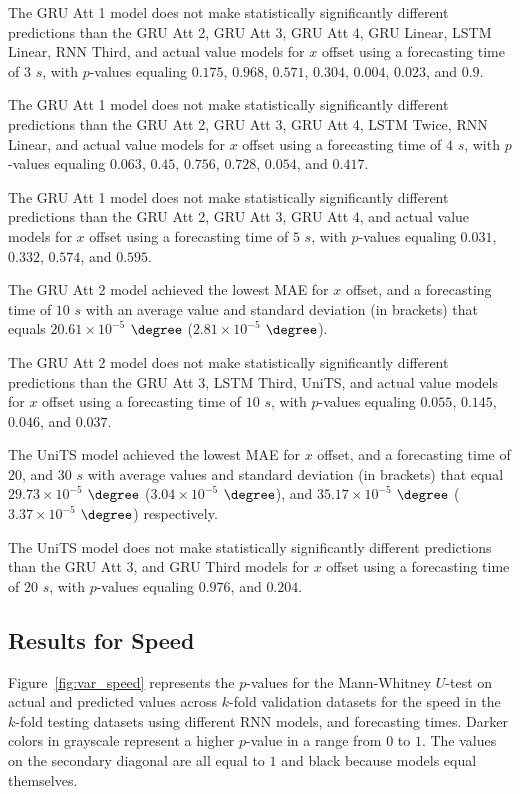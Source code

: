 The GRU Att 1 model does not make statistically significantly different predictions than the GRU Att 2, GRU Att 3, GRU Att 4, GRU Linear, LSTM Linear, RNN Third, and actual value models for $x$ offset using a forecasting time of $3$ $s$, with $p$-values equaling $0.175$, $0.968$, $0.571$, $0.304$, $0.004$, $0.023$, and $0.9$.

The GRU Att 1 model does not make statistically significantly different predictions than the GRU Att 2, GRU Att 3, GRU Att 4, LSTM Twice, RNN Linear, and actual value models for $x$ offset using a forecasting time of $4$ $s$, with $p$-values equaling $0.063$, $0.45$, $0.756$, $0.728$, $0.054$, and $0.417$.

The GRU Att 1 model does not make statistically significantly different predictions than the GRU Att 2, GRU Att 3, GRU Att 4, and actual value models for $x$ offset using a forecasting time of $5$ $s$, with $p$-values equaling $0.031$, $0.332$, $0.574$, and $0.595$.

The GRU Att 2 model achieved the lowest MAE for $x$ offset, and a forecasting time of $10$ $s$ with an average value and standard deviation (in brackets) that equals $20.61 \times 10^{-5}$ $\degree$ ($2.81 \times 10^{-5}$ $\degree$).

The GRU Att 2 model does not make statistically significantly different predictions than the GRU Att 3, LSTM Third, UniTS, and actual value models for $x$ offset using a forecasting time of $10$ $s$, with $p$-values equaling $0.055$, $0.145$, $0.046$, and $0.037$.

The UniTS model achieved the lowest MAE for $x$ offset, and a forecasting time of $20$, and $30$ $s$ with average values and standard deviation (in brackets) that equal $29.73 \times 10^{-5}$ $\degree$ ($3.04 \times 10^{-5}$ $\degree$), and $35.17 \times 10^{-5}$ $\degree$ ($3.37 \times 10^{-5}$ $\degree$) respectively.

The UniTS model does not make statistically significantly different predictions than the GRU Att 3, and GRU Third models for $x$ offset using a forecasting time of $20$ $s$, with $p$-values equaling $0.976$, and $0.204$.

\subsection{Results for Speed}

Figure~\ref{fig:var_speed} represents the $p$-values for the Mann-Whitney $U$-test on actual and predicted values across $k$-fold validation datasets for the speed in the $k$-fold testing datasets using different RNN models, and forecasting times. Darker colors in grayscale represent a higher $p$-value in a range from $0$ to $1$. The values on the secondary diagonal are all equal to $1$ and black because models equal themselves.

